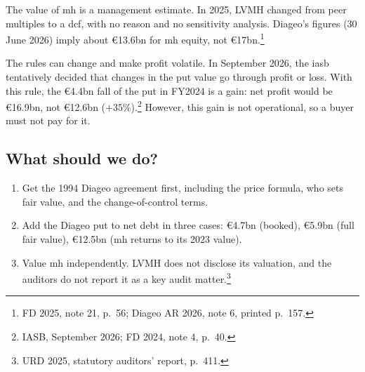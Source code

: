The value of \acs{mh} is a management estimate. In 2025, LVMH changed from peer multiples to a \ac{dcf}, with no reason and no sensitivity analysis.
Diageo's figures (30 June 2026) imply about \euro13.6bn for \acs{mh} equity, not \euro17bn.\footnote{FD 2025, note 21, p.~56; Diageo AR 2026, note 6, printed p.~157.}

The rules can change and make profit volatile.
In September 2026, the \ac{iasb} tentatively decided that changes in the put value go through profit or loss.
With this rule, the \euro4.4bn fall of the put in FY2024 is a gain: net profit would be \euro16.9bn, not \euro12.6bn ($+35\%$).\footnote{IASB, September 2026; FD 2024, note 4, p.~40.}
However, this gain is not operational, so a buyer must not pay for it.

\subsection*{What should we do?}
\begin{enumerate}
\item Get the 1994 Diageo agreement first, including the price formula, who sets fair value, and the change-of-control terms.
\item Add the Diageo put to net debt in three cases: \euro4.7bn (booked), \euro5.9bn (full fair value), \euro12.5bn (\acs{mh} returns to its 2023 value).
\item Value \acs{mh} independently. LVMH does not disclose its valuation, and the auditors do not report it as a key audit matter.\footnote{URD 2025, statutory auditors' report, p.~411.}
\end{enumerate}

